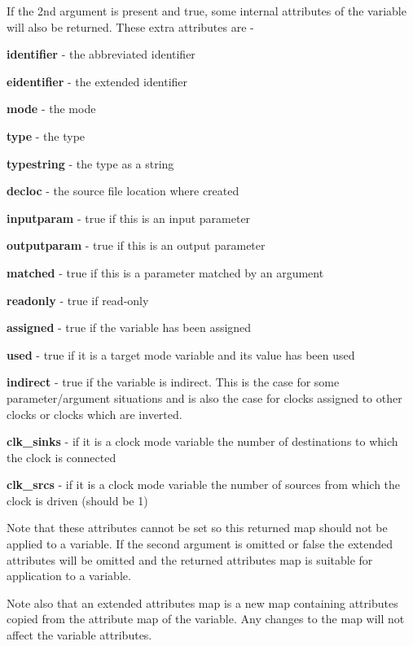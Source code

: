         If the 2nd argument is present and true, some internal attributes
        of the variable will also be returned. These extra attributes are -
        \blist
        \item    {\bf identifier} - the abbreviated identifier
        \item    {\bf eidentifier} - the extended identifier
        \item    {\bf mode} - the mode
        \item    {\bf type} - the type
        \item    {\bf typestring} - the type as a string
        \item    {\bf decloc} - the source file location where created
        \item    {\bf inputparam} - true if this is an input parameter
        \item    {\bf outputparam} - true if this is an output parameter
        \item    {\bf matched} - true if this is a parameter matched by an argument
        \item    {\bf readonly} - true if read-only
        \item    {\bf assigned} - true if the variable has been assigned
        \item    {\bf used} - true if it is a target mode variable and its
                            value has been used
        \item    {\bf indirect} - true if the variable is indirect. This is the case
                            for some parameter/argument situations and is also the
                            case for clocks assigned to other clocks or clocks
                            which are inverted.
        \item    {\bf clk\_sinks} - if it is a clock mode variable the
                            number of destinations to which the clock is connected
        \item    {\bf clk\_srcs} - if it is a clock mode variable the
                            number of sources from which the clock is driven (should be 1)
        \blend
        
        Note that these attributes cannot be set so this returned map should not
        be applied to a variable. If the second argument is omitted or false
        the extended attributes will be omitted and the returned attributes map
        is suitable for application to a variable.
        
        Note also that an extended attributes map is a new map containing attributes
        copied from the attribute map of the variable. Any changes to the map will not
        affect the variable attributes.


